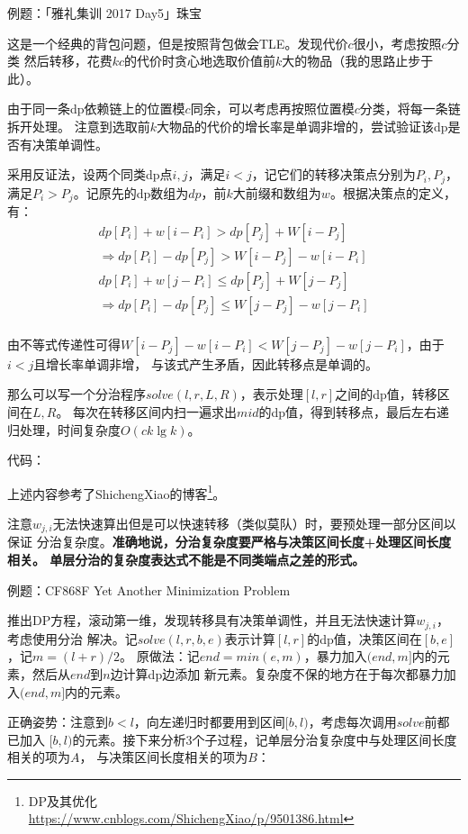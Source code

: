 例题：「雅礼集训 2017 Day5」珠宝

这是一个经典的背包问题，但是按照背包做会TLE。发现代价$c$很小，考虑按照$c$分类
然后转移，花费$kc$的代价时贪心地选取价值前$k$大的物品（我的思路止步于此）。

由于同一条dp依赖链上的位置模$c$同余，可以考虑再按照位置模$c$分类，将每一条链拆开处理。
注意到选取前$k$大物品的代价的增长率是单调非增的，尝试验证该dp是否有决策单调性。

采用反证法，设两个同类dp点$i,j$，满足$i<j$，记它们的转移决策点分别为$P_i,P_j$，
满足$P_i>P_j$。记原先的dp数组为$dp$，前$k$大前缀和数组为$w$。根据决策点的定义，有：
\begin{eqnarray*}
    dp[P_i]+w[i-P_i]>dp[P_j]+W[i-P_j]\\
    \Rightarrow dp[P_i]-dp[P_j]>W[i-P_j]-w[i-P_i]\\
    dp[P_i]+w[j-P_i]\leq dp[P_j]+W[j-P_j]\\
    \Rightarrow dp[P_i]-dp[P_j]\leq W[j-P_j]-w[j-P_i]\\
\end{eqnarray*}

由不等式传递性可得$W[i-P_j]-w[i-P_i]<W[j-P_j]-w[j-P_i]$，由于$i<j$且增长率单调非增，
与该式产生矛盾，因此转移点是单调的。

那么可以写一个分治程序$solve(l,r,L,R)$，表示处理$[l,r]$之间的dp值，转移区间在$L,R$。
每次在转移区间内扫一遍求出$mid$的dp值，得到转移点，最后左右递归处理，时间复杂度$O(ck\lg k)$。

代码：


上述内容参考了ShichengXiao的博客\footnote{
    DP及其优化\\
    \url{https://www.cnblogs.com/ShichengXiao/p/9501386.html}
}。

注意$w_{j,i}$无法快速算出但是可以快速转移（类似莫队）时，要预处理一部分区间以保证
分治复杂度。{\bfseries 准确地说，分治复杂度要严格与决策区间长度+处理区间长度相关。
单层分治的复杂度表达式不能是不同类端点之差的形式。}

例题：CF868F Yet Another Minimization Problem

推出DP方程，滚动第一维，发现转移具有决策单调性，并且无法快速计算$w_{j,i}$，考虑使用分治
解决。记$solve(l,r,b,e)$表示计算$[l,r]$的dp值，决策区间在$[b,e]$，记$m=(l+r)/2$。
原做法：记$end=min(e,m)$，暴力加入$(end,m]$内的元素，然后从$end$到$n$边计算dp边添加
新元素。复杂度不保的地方在于每次都暴力加入$(end,m]$内的元素。

正确姿势：注意到$b<l$，向左递归时都要用到区间$[b,l)$，考虑每次调用$solve$前都已加入
$[b,l)$的元素。接下来分析3个子过程，记单层分治复杂度中与处理区间长度相关的项为$A$，
与决策区间长度相关的项为$B$：

